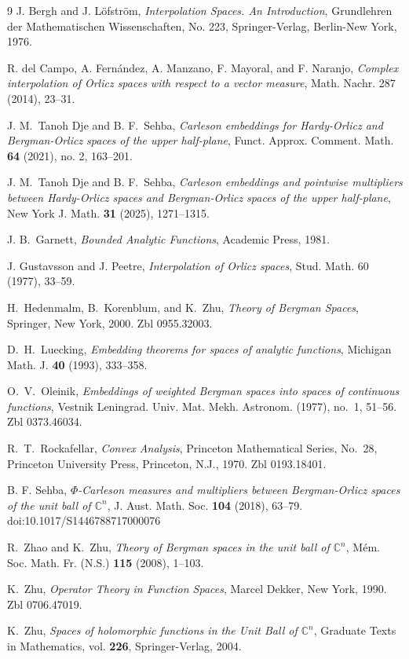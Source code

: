 \documentclass[12pt]{amsart}
\begin{document}
\begin{thebibliography}{9}
J. Bergh and J. Löfström,
\emph{Interpolation Spaces. An Introduction},
Grundlehren der Mathematischen Wissenschaften, No. 223, Springer-Verlag, Berlin-New York, 1976.

R. del Campo, A. Fernández, A. Manzano, F. Mayoral, and F. Naranjo,
\emph{Complex interpolation of Orlicz spaces with respect to a vector measure},
Math. Nachr. 287 (2014), 23--31.

J. M.\ Tanoh Dje and B. F.\ Sehba,
\emph{Carleson embeddings for Hardy-Orlicz and Bergman-Orlicz spaces
of the upper half-plane},
Funct. Approx. Comment. Math. \textbf{64} (2021), no. 2, 163--201.

J. M.\ Tanoh Dje and B. F.\ Sehba,
\emph{Carleson embeddings and pointwise multipliers between Hardy-Orlicz spaces and Bergman-Orlicz spaces of the upper half-plane},
New York J. Math. \textbf{31} (2025), 1271–1315.

J. B.\ Garnett,
\emph{Bounded Analytic Functions},
Academic Press, 1981.

J. Gustavsson and J. Peetre,
\emph{Interpolation of Orlicz spaces},
Stud. Math. 60 (1977), 33--59.

H.~Hedenmalm, B.~Korenblum, and K.~Zhu,
\emph{Theory of Bergman Spaces},
Springer, New York, 2000.
\newblock Zbl 0955.32003.

D.~H.~Luecking,
\emph{Embedding theorems for spaces of analytic functions},
Michigan Math. J. \textbf{40} (1993), 333--358.

O.~V.~Oleinik,
\emph{Embeddings of weighted Bergman spaces into spaces of continuous functions},
Vestnik Leningrad. Univ. Mat. Mekh. Astronom. (1977), no.~1, 51--56.
\newblock Zbl 0373.46034.


R.~T.~Rockafellar,
\emph{Convex Analysis},
Princeton Mathematical Series, No.~28, Princeton University Press, Princeton, N.J., 1970.
\newblock Zbl 0193.18401.

B. F. Sehba,
\emph{$\Phi$-Carleson measures and multipliers between Bergman-Orlicz spaces of the unit ball of $\mathbb{C}^n$},
J. Aust. Math. Soc. \textbf{104} (2018), 63–79.
doi:10.1017/S1446788717000076

R.~Zhao and K.~Zhu,
\emph{Theory of Bergman spaces in the unit ball of $\mathbb{C}^n$},
M\'em. Soc. Math. Fr. (N.S.) \textbf{115} (2008), 1--103.


K.~Zhu,
\emph{Operator Theory in Function Spaces},
Marcel Dekker, New York, 1990.
\newblock Zbl 0706.47019.

K.~Zhu,
\emph{Spaces of holomorphic functions in the Unit Ball of $\mathbb{C}^n$}, Graduate Texts in Mathematics, vol. \textbf{226}, Springer-Verlag, 2004.


\end{thebibliography}
\end{document}

